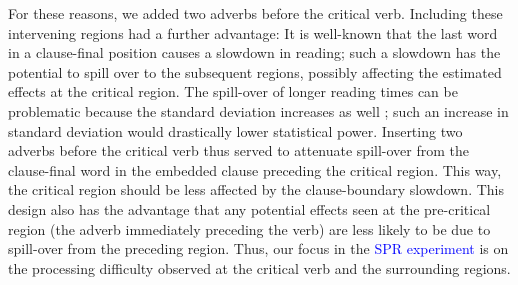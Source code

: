 \documentclass[a4paper, man, floatsintext]{apa7}
\begin{document}
For these reasons, we added two adverbs before the critical verb. Including these intervening regions had a further advantage: 
It is well-known \parencite[e.g., ][]{rayner2000effect} that the last word in a clause-final position causes a slowdown in reading; such a slowdown has the potential to spill over to the subsequent regions, possibly affecting the estimated effects at the critical region. The spill-over of longer reading times can be problematic because the standard deviation increases as well \parencite{wagenmakers2007linear}; such an increase in standard deviation would drastically lower statistical power. 
Inserting two adverbs before the critical verb thus served to attenuate spill-over from the clause-final word in the embedded clause preceding the critical region. This way, the critical region should be less affected by the clause-boundary slowdown. This design also has the advantage that any potential effects seen at the pre-critical region (the adverb immediately preceding the verb) are less likely to be due to spill-over from the preceding region. Thus, our focus in the \textcolor{blue}{SPR experiment} is on the processing difficulty observed at the critical verb and the surrounding regions.
\end{document}
